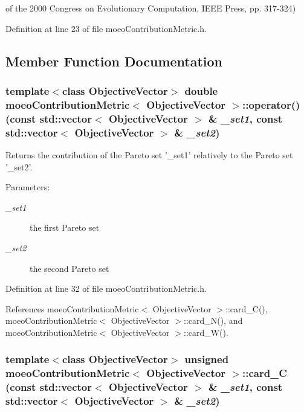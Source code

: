 of the 2000 Congress on Evolutionary Computation, IEEE Press, pp. 317-324) 



Definition at line 23 of file moeo\-Contribution\-Metric.h.

\subsection{Member Function Documentation}
\subsubsection{\setlength{\rightskip}{0pt plus 5cm}template$<$class Objective\-Vector$>$ double {\bf moeo\-Contribution\-Metric}$<$ Objective\-Vector $>$::operator() (const std::vector$<$ Objective\-Vector $>$ \& {\em \_\-set1}, const std::vector$<$ Objective\-Vector $>$ \& {\em \_\-set2})\hspace{0.3cm}{\tt  [inline]}}\label{classmoeoContributionMetric_491610f6557874c2989eaa7a75117dcb}


Returns the contribution of the Pareto set '\_\-set1' relatively to the Pareto set '\_\-set2'. 

\begin{Desc}
\item[Parameters:]
\begin{description}
\item[{\em \_\-set1}]the first Pareto set \item[{\em \_\-set2}]the second Pareto set \end{description}
\end{Desc}


Definition at line 32 of file moeo\-Contribution\-Metric.h.

References moeo\-Contribution\-Metric$<$ Objective\-Vector $>$::card\_\-C(), moeo\-Contribution\-Metric$<$ Objective\-Vector $>$::card\_\-N(), and moeo\-Contribution\-Metric$<$ Objective\-Vector $>$::card\_\-W().
\subsubsection{\setlength{\rightskip}{0pt plus 5cm}template$<$class Objective\-Vector$>$ unsigned {\bf moeo\-Contribution\-Metric}$<$ Objective\-Vector $>$::card\_\-C (const std::vector$<$ Objective\-Vector $>$ \& {\em \_\-set1}, const std::vector$<$ Objective\-Vector $>$ \& {\em \_\-set2})\hspace{0.3cm}{\tt  [inline, private]}}\label{classmoeoContributionMetric_9bfa241c1d6d3fcfd6523ed04c089af0}


